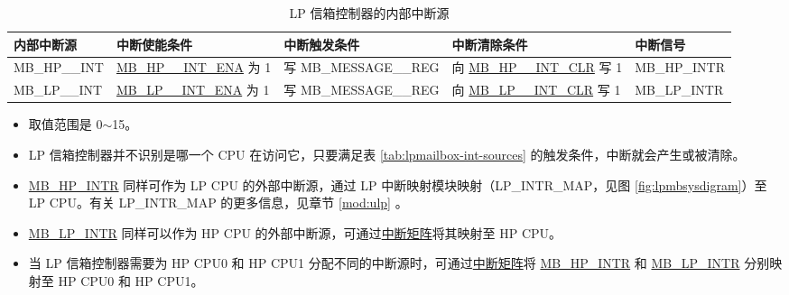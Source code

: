 \documentclass[main\_\_CN.tex]{subfiles}
\begin{document}
\begin{longtable}{ | L{2.3cm} | L{3.8cm} | L{3.9cm} | L{4.2cm} | L{2.2cm} | }
\caption{LP 信箱控制器的内部中断源} \label{tab:lpmailbox-int-sources}
\\ \hline
{}
\textbf{内部中断源} & \textbf{中断使能条件}  & \textbf{中断触发条件}  & \textbf{中断清除条件}  &  \textbf{中断信号}\\ \hline
\label{int:MBHPmINT} MB\_HP\_\_INT & \hyperref[fielddesc:MBHP0INTENA]{MB\_HP\_\_INT\_ENA} 为 1 &  写 MB\_MESSAGE\_\_REG & 向 \hyperref[fielddesc:MBHP0INTCLR]{MB\_HP\_\_INT\_CLR} 写 1  & MB\_HP\_INTR  \\ \hline
\label{int:MBLPnINT} MB\_LP\_\_INT & \hyperref[fielddesc:MBLP0INTENA]{MB\_LP\_\_INT\_ENA} 为 1 &  写 MB\_MESSAGE\_\_REG & 向 \hyperref[fielddesc:MBLP0INTCLR]{MB\_LP\_\_INT\_CLR} 写 1  & MB\_LP\_INTR  \\ \hline
\end{longtable}
\begin{tiplisting}
\vspace{-2em}
\begin{itemize}
    \item {} 取值范围是 0$\sim$15。
    \item LP 信箱控制器并不识别是哪一个 CPU 在访问它，只要满足表 \ref{tab:lpmailbox-int-sources} 的触发条件，中断就会产生或被清除。
    \item\hyperref[tab:lpmailbox-int-sources]{MB\_HP\_INTR} 同样可作为 LP CPU 的外部中断源，通过 LP 中断映射模块映射（LP\_INTR\_MAP，见图 \ref{fig:lpmbsysdigram}）至 LP CPU。有关 LP\_INTR\_MAP 的更多信息，见章节 \ref{mod:ulp} \textit{}。
    \item\hyperref[tab:lpmailbox-int-sources]{MB\_LP\_INTR} 同样可以作为 HP CPU 的外部中断源，可通过\hyperref[mod:intmtrx]{中断矩阵}将其映射至 HP CPU。
    \item 当 LP 信箱控制器需要为 HP CPU0 和 HP CPU1 分配不同的中断源时，可通过\hyperref[mod:intmtrx]{中断矩阵}将 \hyperref[tab:lpmailbox-int-sources]{MB\_HP\_INTR} 和 \hyperref[tab:lpmailbox-int-sources]{MB\_LP\_INTR} 分别映射至 HP CPU0 和 HP CPU1。
    \end{itemize}
\end{tiplisting}
\end{document}
